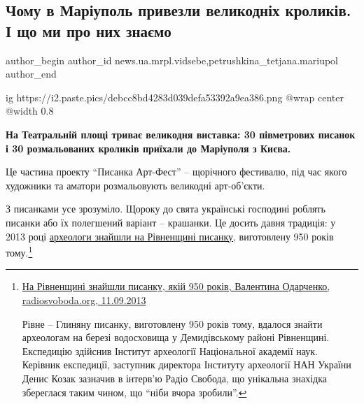  
 
 
 
 
 
\subsection{Чому в Маріуполь привезли великодніх кроликів. І що ми про них знаємо}
\label{sec:01_05_2019.stz.news.ua.mrpl.vidsebe.1.chomu_v_mariupol_pryvezly_krolykiv}
 
\ifcmt
 author_begin
   author_id news.ua.mrpl.vidsebe,petrushkina_tetjana.mariupol
 author_end
\fi

\ifcmt
  ig https://i2.paste.pics/debcc8bd4283d039defa53392a9ea386.png
  @wrap center
  @width 0.8
\fi

\textbf{На Театральній площі триває великодня виставка: 30 півметрових писанок і 30
розмальованих кроликів приїхали до Маріуполя з Києва.}

Це частина проекту \enquote{Писанка Арт-Фест} – щорічного фестивалю, під час якого
художники та аматори розмальовують великодні арт-об'єкти.

З писанками усе зрозуміло. Щороку до свята українські господині роблять писанки
або їх полегшений варіант – крашанки. Це досить давня традиція: у 2013 році
\href{https://www.radiosvoboda.org/a/25102278.html}{археологи знайшли на Рівненщині писанку}, виготовлену 950 років тому.\footnote{%
\href{https://www.radiosvoboda.org/a/25102278.html}{На Рівненщині знайшли писанку, якій 950 років, Валентина Одарченко, radiosvoboda.org, 11.09.2013}\par %
Рівне – Глиняну писанку, виготовлену 950 років тому, вдалося знайти археологам
на березі водосховища у Демидівському районі Рівненщині. Експедицію здійснив
Інститут археології Національної академії наук. Керівник експедиції, заступник
директора Інституту археології НАН України Денис Козак зазначив в інтерв'ю
Радіо Свобода, що унікальна знахідка збереглася таким чином, що \enquote{ніби вчора
зробили}.
}


